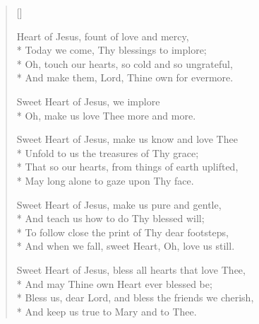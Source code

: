 \newHymn


\begin{verse}[\versewidth]

 Heart of Jesus, fount of love and mercy,\\*
Today we come, Thy blessings to implore;\\*
Oh, touch our hearts, so cold and so ungrateful,\\*
And make them, Lord, Thine own for evermore.

\begin{indentedVerse}
\vin Sweet Heart of Jesus, we implore\\*
\vin Oh, make us love Thee more and more.
\end{indentedVerse}

Sweet Heart of Jesus, make us know and love Thee\\*
Unfold to us the treasures of Thy grace;\\*
That so our hearts, from things of earth uplifted,\\*
May long alone to gaze upon Thy face.

Sweet Heart of Jesus, make us pure and gentle,\\*
And teach us how to do Thy blessed will;\\*
To follow close the print of Thy dear footsteps,\\*
And when we fall, sweet Heart, Oh, love us still.

Sweet Heart of Jesus, bless all hearts that love Thee,\\*
And may Thine own Heart ever blessed be;\\*
Bless us, dear Lord, and bless the friends we cherish,\\*
And keep us true to Mary and to Thee.

\end{verse}

